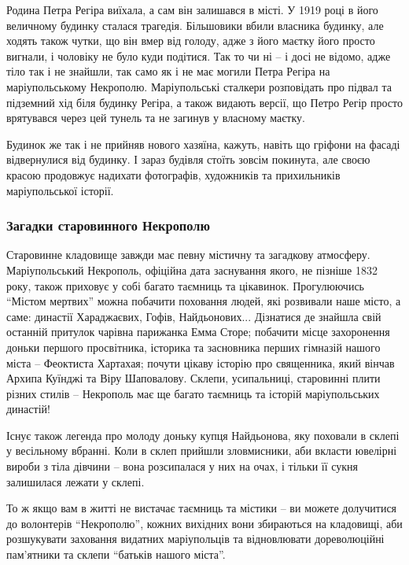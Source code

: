 Родина Петра Регіра виїхала, а сам він залишався в місті. У 1919 році в його
величному будинку сталася трагедія. Більшовики вбили власника будинку, але
ходять також чутки, що він вмер від голоду, адже з його маєтку його просто
вигнали, і чоловіку не було куди подітися. Так то чи ні – і досі не відомо,
адже тіло так і не знайшли, так само як і не має могили Петра Регіра на
маріупольському Некрополю. Маріупольські сталкери розповідать про підвал та
підземний хід біля будинку Регіра, а також видають версії, що Петро Регір
просто врятувався через цей тунель та не загинув у власному маєтку.

Будинок же так і не прийняв нового хазяїна, кажуть, навіть що гріфони на фасаді
відвернулися від будинку. І зараз будівля стоїть зовсім покинута, але своєю
красою продовжує надихати фотографів, художників та прихильників маріупольської
історії.


\subsubsection{Загадки старовинного Некрополю}


Старовинне кладовище завжди має певну містичну та загадкову атмосферу.
Маріупольський Некрополь, офіційна дата заснування якого, не пізніше 1832 року,
також приховує у собі багато таємниць та цікавинок. Прогулюючись \enquote{Містом
мертвих} можна побачити поховання людей, які розвивали наше місто, а саме:
династії Хараджаєвих, Гофів, Найдьонових... Дізнатися де знайшла свій останній
притулок чарівна парижанка Емма Сторе; побачити місце захоронення доньки
першого просвітника, історика та засновника перших гімназій нашого міста –
Феоктиста Хартахая; почути цікаву історію про священника, який вінчав Архипа
Куїнджі та Віру Шаповалову. Склепи, усипальниці, старовинні плити різних стилів
– Некрополь має ще багато таємниць та історій маріупольських династій!

Існує також легенда про молоду доньку купця Найдьонова, яку поховали в склепі у
весільному вбранні. Коли в склеп прийшли зловмисники, аби вкласти ювелірні
вироби з тіла дівчини – вона розсипалася у них на очах, і тільки її сукня
залишилася лежати у склепі.

То ж якщо вам в житті не вистачає таємниць та містики – ви можете долучитися до
волонтерів \enquote{Некрополю}, кожних вихідних вони збираються на кладовищі, аби
розшукувати заховання видатних маріупольців та відновлювати дореволюційні
пам'ятники та склепи \enquote{батьків нашого міста}.

